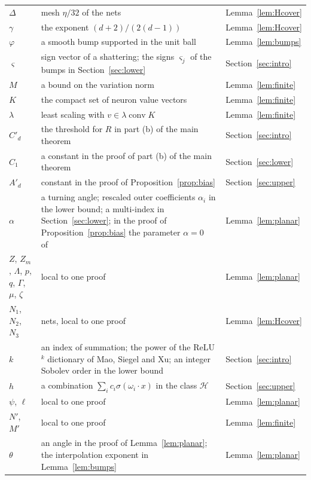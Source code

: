 {\begin{longtable}{@{}p{}p{}l@{}}
$\Delta$ & mesh $\eta/32$ of the nets & Lemma~\ref{lem:Hcover} \\
$\gamma$ & the exponent $(d+2)/(2(d-1))$ & Lemma~\ref{lem:Hcover} \\
$\varphi$ & a smooth bump supported in the unit ball & Lemma~\ref{lem:bumps} \\
$\varsigma$ & sign vector of a shattering; the signs $\varsigma_j$ of the bumps in Section~\ref{sec:lower} & Section~\ref{sec:intro} \\
$M$ & a bound on the variation norm & Lemma~\ref{lem:finite} \\
$K$ & the compact set of neuron value vectors & Lemma~\ref{lem:finite} \\
$\lambda$ & least scaling with $v\in\lambda\operatorname{conv}K$ & Lemma~\ref{lem:finite} \\
$C'_d$ & the threshold for $R$ in part (b) of the main theorem & Section~\ref{sec:intro} \\
$C_1$ & a constant in the proof of part (b) of the main theorem & Section~\ref{sec:lower} \\
$A'_d$ & constant in the proof of Proposition~\ref{prop:bias} & Section~\ref{sec:upper} \\
$\alpha$ & a turning angle; rescaled outer coefficients $\alpha_i$ in the lower bound; a multi-index in Section~\ref{sec:lower}; in the proof of Proposition~\ref{prop:bias} the parameter $\alpha=0$ of~\cite[Theorem~2]{Siegel} & Lemma~\ref{lem:planar} \\
$Z$, $Z_m$, $\Lambda$, $p$, $q$, $\Gamma$, $\mu$, $\zeta$ & local to one proof & Lemma~\ref{lem:planar} \\
$N_1$, $N_2$, $N_3$ & nets, local to one proof & Lemma~\ref{lem:Hcover} \\
$k$ & an index of summation; the power of the ReLU$^k$ dictionary of Mao, Siegel and Xu; an integer Sobolev order in the lower bound & Section~\ref{sec:intro} \\
$h$ & a combination $\sum_ic_i\sigma(\omega_i\cdot x)$ in the class $\mathcal H$ & Section~\ref{sec:upper} \\
$\psi$, $\ell$ & local to one proof & Lemma~\ref{lem:planar} \\
$N'$, $M'$ & local to one proof & Lemma~\ref{lem:finite} \\
$\theta$ & an angle in the proof of Lemma~\ref{lem:planar}; the interpolation exponent in Lemma~\ref{lem:bumps} & Lemma~\ref{lem:planar} \\
\bottomrule
\end{longtable}}
